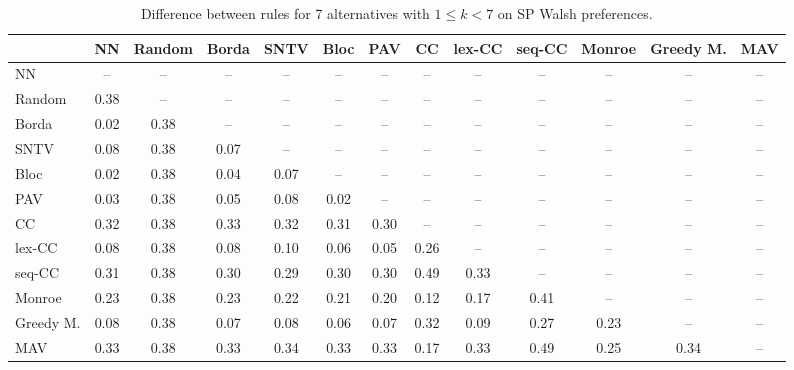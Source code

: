 
\begin{table*}[htbp]
\centering
\begin{tabular}{lcccccccccccc}
\toprule
 & NN & Random & Borda & SNTV & Bloc & PAV & CC & lex-CC & seq-CC & Monroe & Greedy M. & MAV \\
\midrule
NN & -- & -- & -- & -- & -- & -- & -- & -- & -- & -- & -- & -- \\
Random & \cellcolor{blue!38} 0.38 & -- & -- & -- & -- & -- & -- & -- & -- & -- & -- & -- \\
Borda & \cellcolor{blue!2} 0.02 & \cellcolor{blue!38} 0.38 & -- & -- & -- & -- & -- & -- & -- & -- & -- & -- \\
SNTV & \cellcolor{blue!8} 0.08 & \cellcolor{blue!38} 0.38 & \cellcolor{blue!7} 0.07 & -- & -- & -- & -- & -- & -- & -- & -- & -- \\
Bloc & \cellcolor{blue!2} 0.02 & \cellcolor{blue!38} 0.38 & \cellcolor{blue!4} 0.04 & \cellcolor{blue!7} 0.07 & -- & -- & -- & -- & -- & -- & -- & -- \\
PAV & \cellcolor{blue!3} 0.03 & \cellcolor{blue!38} 0.38 & \cellcolor{blue!5} 0.05 & \cellcolor{blue!8} 0.08 & \cellcolor{blue!2} 0.02 & -- & -- & -- & -- & -- & -- & -- \\
CC & \cellcolor{blue!32} 0.32 & \cellcolor{blue!38} 0.38 & \cellcolor{blue!33} 0.33 & \cellcolor{blue!32} 0.32 & \cellcolor{blue!31} 0.31 & \cellcolor{blue!30} 0.30 & -- & -- & -- & -- & -- & -- \\
lex-CC & \cellcolor{blue!8} 0.08 & \cellcolor{blue!38} 0.38 & \cellcolor{blue!8} 0.08 & \cellcolor{blue!10} 0.10 & \cellcolor{blue!6} 0.06 & \cellcolor{blue!5} 0.05 & \cellcolor{blue!26} 0.26 & -- & -- & -- & -- & -- \\
seq-CC & \cellcolor{blue!31} 0.31 & \cellcolor{blue!38} 0.38 & \cellcolor{blue!30} 0.30 & \cellcolor{blue!28} 0.29 & \cellcolor{blue!30} 0.30 & \cellcolor{blue!30} 0.30 & \cellcolor{blue!49} 0.49 & \cellcolor{blue!33} 0.33 & -- & -- & -- & -- \\
Monroe & \cellcolor{blue!23} 0.23 & \cellcolor{blue!38} 0.38 & \cellcolor{blue!23} 0.23 & \cellcolor{blue!22} 0.22 & \cellcolor{blue!21} 0.21 & \cellcolor{blue!20} 0.20 & \cellcolor{blue!12} 0.12 & \cellcolor{blue!17} 0.17 & \cellcolor{blue!41} 0.41 & -- & -- & -- \\
Greedy M. & \cellcolor{blue!8} 0.08 & \cellcolor{blue!38} 0.38 & \cellcolor{blue!7} 0.07 & \cellcolor{blue!8} 0.08 & \cellcolor{blue!6} 0.06 & \cellcolor{blue!7} 0.07 & \cellcolor{blue!32} 0.32 & \cellcolor{blue!9} 0.09 & \cellcolor{blue!27} 0.27 & \cellcolor{blue!23} 0.23 & -- & -- \\
MAV & \cellcolor{blue!33} 0.33 & \cellcolor{blue!38} 0.38 & \cellcolor{blue!33} 0.33 & \cellcolor{blue!34} 0.34 & \cellcolor{blue!33} 0.33 & \cellcolor{blue!33} 0.33 & \cellcolor{blue!17} 0.17 & \cellcolor{blue!33} 0.33 & \cellcolor{blue!49} 0.49 & \cellcolor{blue!25} 0.25 & \cellcolor{blue!34} 0.34 & -- \\
\bottomrule
\end{tabular}

\caption{Difference between rules for 7 alternatives with $1 \leq k < 7$ on SP Walsh preferences.}
\label{tab:rule_distance_heatmap-m=[7]-pref_dist=single_peaked_walsh}
\end{table*}
    
